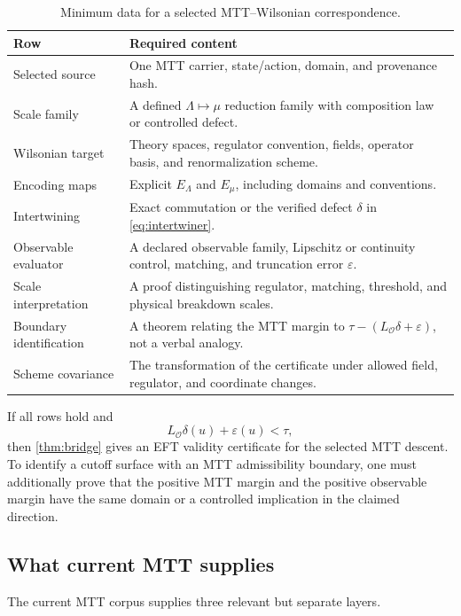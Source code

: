 \documentclass[11pt]{article}
\theoremstyle{definition}
\theoremstyle{remark}
\begin{document}
\begin{table}[ht]
\centering
\small
\begin{tabularx}{\textwidth}{@{}p{}Y@{}}
\toprule
Row & Required content \\
\midrule
Selected source
& One MTT carrier, state/action, domain, and provenance hash. \\
Scale family
& A defined \(\Lambda\mapsto\mu\) reduction family with composition law or
  controlled defect. \\
Wilsonian target
& Theory spaces, regulator convention, fields, operator basis, and
  renormalization scheme. \\
Encoding maps
& Explicit \(E_\Lambda\) and \(E_\mu\), including domains and conventions. \\
Intertwining
& Exact commutation or the verified defect \(\delta\) in
  \cref{eq:intertwiner}. \\
Observable evaluator
& A declared observable family, Lipschitz or continuity control, matching,
  and truncation error \(\varepsilon\). \\
Scale interpretation
& A proof distinguishing regulator, matching, threshold, and physical
  breakdown scales. \\
Boundary identification
& A theorem relating the MTT margin to
  \(\tau-(L_{\mathcal O}\delta+\varepsilon)\), not a verbal analogy. \\
Scheme covariance
& The transformation of the certificate under allowed field,
  regulator, and coordinate changes. \\
\bottomrule
\end{tabularx}
\caption{Minimum data for a selected MTT--Wilsonian correspondence.}
\label{tab:bridge}
\end{table}

If all rows hold and
\[
 L_{\mathcal O}\delta(u)+\varepsilon(u)<\tau,
\]
then \cref{thm:bridge} gives an EFT validity certificate for the selected MTT
descent.  To identify a cutoff surface with an MTT admissibility boundary, one
must additionally prove that the positive MTT margin and the positive
observable margin have the same domain or a controlled implication in the
claimed direction.

\subsection{What current MTT supplies}

The current MTT corpus supplies three relevant but separate layers.
\end{document}
